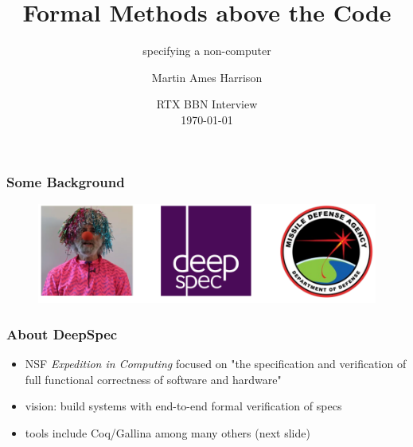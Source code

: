 \documentclass[
        11pt, %
]{beamer}
\title[FMatC]{Formal Methods above the Code} %
\subtitle{specifying a non-computer} %
\author[]{Martin Ames Harrison} %
\institute[RTX BBN]{} %
\date[\today]{RTX BBN Interview \\ \today} %
\begin{document}

\begin{frame}
        \titlepage %
\end{frame}



\begin{frame}
        \frametitle{Some Background} %
        \begin{figure}
                \includegraphics[width=\linewidth]{backgroundPic.png}
        \end{figure}
\end{frame}

\begin{frame}
    \frametitle{About DeepSpec} 
    \begin{itemize}
        \item NSF \emph{Expedition in Computing} focused on "the specification and verification of full functional correctness of software and hardware"
        \item vision: build systems with end-to-end formal verification of specs
        \item tools include Coq/Gallina among many others (next slide)
    \end{itemize}
\end{frame}
\end{document}
